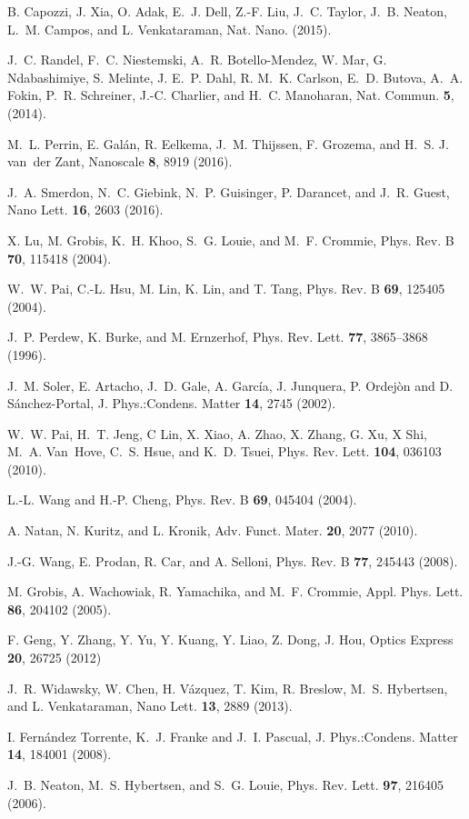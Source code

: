 \documentclass[11pt,showpacs,amsmath,amssymbl]{revtex4}
\begin{document}
\begin{thebibliography}{10}
B. Capozzi, J. Xia, O. Adak, E.~J. Dell, Z.-F. Liu, J.~C.
  Taylor, J.~B. Neaton, L.~M. Campos, and L. Venkataraman, Nat.
 Nano.  (2015).

J.~C. Randel, F.~C. Niestemski, A.~R. Botello-Mendez, W.
  Mar, G. Ndabashimiye, S. Melinte, J. E.~P. Dahl, R. M.~K.
  Carlson, E.~D. Butova, A.~A. Fokin, P.~R. Schreiner, J.-C. Charlier, and H.~C. Manoharan, Nat. Commun. {\bf 5},
  (2014).

M.~L. Perrin, E. Gal{\'a}n, R. Eelkema, J.~M. Thijssen, F. Grozema, and H.~S. J. van~der Zant, Nanoscale {\bf 8},  8919  (2016).

J.~A. Smerdon, N.~C. Giebink, N.~P. Guisinger, P. Darancet, and
  J.~R. Guest, Nano Lett. {\bf 16},  2603  (2016).

X. Lu, M. Grobis, K.~H. Khoo, S.~G. Louie, and M.~F. Crommie,
Phys. Rev. B {\bf 70}, 115418 (2004).


W.~W. Pai, C.-L. Hsu, M. Lin, K. Lin, and T. Tang, Phys. Rev. B {\bf 69},
  125405  (2004).

J.~P. Perdew, K. Burke, and M. Ernzerhof, Phys. Rev. Lett. {\bf 77},
  3865--3868  (1996).

J.~M. Soler, E. Artacho, J.~D. Gale, A. Garc\'ia, J. Junquera, P. Ordej\`on and D. S\'anchez-Portal, J. Phys.:Condens. Matter {\bf 14},
  2745  (2002).
    
W.~W. Pai, H.~T. Jeng, C Lin, X. Xiao, A. Zhao, X. Zhang, G. Xu, X Shi, M.~A.
  Van~Hove, C.~S. Hsue, and K.~D. Tsuei, Phys. Rev. Lett. {\bf 104},  036103
  (2010).

L.-L. Wang and H.-P. Cheng, Phys. Rev. B {\bf 69},  045404  (2004).

A. Natan, N. Kuritz, and L. Kronik, Adv. Funct. Mater.
  {\bf 20},  2077  (2010).

J.-G. Wang, E. Prodan, R. Car, and A. Selloni, Phys. Rev. B
  {\bf 77},  245443  (2008).

M. Grobis, A. Wachowiak, R. Yamachika, and M.~F. Crommie, Appl. Phys. Lett. {\bf 86}, 204102 (2005).

F. Geng, Y. Zhang, Y. Yu, Y. Kuang, Y. Liao, Z. Dong, J. Hou, Optics Express {\bf 20}, 26725 (2012)

J.~R. Widawsky, W. Chen, H. V{\'a}zquez, T. Kim, R. Breslow, M.~S. Hybertsen,
  and L. Venkataraman, Nano Lett. {\bf 13},  2889  (2013).

I. Fern\'andez Torrente, K.~J. Franke and J.~I. Pascual, J. Phys.:Condens. Matter {\bf 14},
  184001  (2008).

J.~B. Neaton, M.~S. Hybertsen, and S.~G. Louie,
Phys. Rev. Lett.  {\bf 97}, 216405 (2006).

  
\end{thebibliography}
\end{document}
